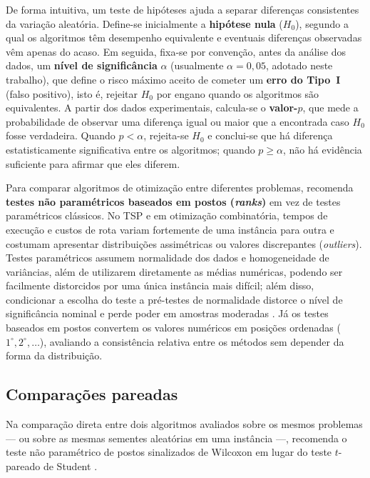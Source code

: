 De forma intuitiva, um teste de hipóteses ajuda a separar diferenças consistentes da variação aleatória.
Define-se inicialmente a \textbf{hipótese nula} (\(H_0\)), segundo a qual os algoritmos têm desempenho equivalente e eventuais diferenças observadas vêm apenas do acaso.
Em seguida, fixa-se por convenção, antes da análise dos dados, um \textbf{nível de significância} \(\alpha\) (usualmente \(\alpha = 0{,}05\), adotado neste trabalho), que define o risco máximo aceito de cometer um \textbf{erro do Tipo~I} (falso positivo), isto é, rejeitar \(H_0\) por engano quando os algoritmos são equivalentes.
A partir dos dados experimentais, calcula-se o \textbf{valor-\(p\)}, que mede a probabilidade de observar uma diferença igual ou maior que a encontrada caso \(H_0\) fosse verdadeira.
Quando \(p < \alpha\), rejeita-se \(H_0\) e conclui-se que há diferença estatisticamente significativa entre os algoritmos; quando \(p \ge \alpha\), não há evidência suficiente para afirmar que eles diferem.

Para comparar algoritmos de otimização entre diferentes problemas, \textcite{demsar2006statistical} recomenda \textbf{testes não paramétricos baseados em postos (\emph{ranks})} em vez de testes paramétricos clássicos.
No TSP e em otimização combinatória, tempos de execução e custos de rota variam fortemente de uma instância para outra e costumam apresentar distribuições assimétricas ou valores discrepantes (\emph{outliers}).
Testes paramétricos assumem normalidade dos dados e homogeneidade de variâncias, além de utilizarem diretamente as médias numéricas, podendo ser facilmente distorcidos por uma única instância mais difícil; além disso, condicionar a escolha do teste a pré-testes de normalidade distorce o nível de significância nominal e perde poder em amostras moderadas \autocite{demsar2006statistical}.
Já os testes baseados em postos convertem os valores numéricos em posições ordenadas (\(1^\circ, 2^\circ, \dots\)), avaliando a consistência relativa entre os métodos sem depender da forma da distribuição.

\subsection{Comparações pareadas}\label{sec-271-comparacoes-pareadas}

Na comparação direta entre dois algoritmos avaliados sobre os mesmos problemas --- ou sobre as mesmas sementes aleatórias em uma instância ---, \textcite[Seção~3.1.2]{demsar2006statistical} recomenda o teste não paramétrico de postos sinalizados de Wilcoxon \autocite{wilcoxon1945individual} em lugar do teste \(t\)-pareado de Student \autocite{student1908probable}.

